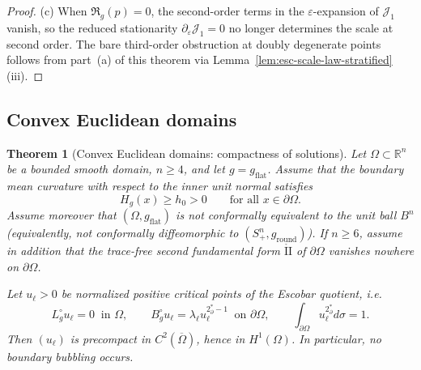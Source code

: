\documentclass[11pt,reqno,a4paper]{amsart}
\numberwithin{equation}{section}
\theoremstyle{plain}
\newtheorem{theorem}{Theorem}[section]
\theoremstyle{remark}
\theoremstyle{plain}
\begin{document}
\begin{proof}
\smallskip
(c) When $\mathfrak R_g(p)=0$, the second-order terms in the $\varepsilon$-expansion of $\mathcal J_1$ vanish,
so the reduced stationarity $\partial_\varepsilon\mathcal J_1=0$ no longer determines the scale at second order.
The bare third-order obstruction at doubly degenerate points follows from part~(a) of this theorem
via Lemma~\ref{lem:esc-scale-law-stratified}(iii).
\end{proof}

\subsection{Convex Euclidean domains}

\begin{theorem}[Convex Euclidean domains: compactness of solutions]\label{thm:convex-compactness}
Let $\Omega\subset\mathbb R^n$ be a bounded smooth domain, $n\ge4$, and let
$g=g_{\mathrm{flat}}$. Assume that the boundary mean curvature with respect to the
\emph{inner} unit normal satisfies
\[
H_g(x)\ge h_0>0 \qquad \text{for all }x\in\partial\Omega.
\]
Assume moreover that $(\Omega,g_{\mathrm{flat}})$ is not conformally equivalent to the
unit ball $B^n$ (equivalently, not conformally diffeomorphic to
$(S^n_+,g_{\mathrm{round}})$). If $n\ge6$, assume in addition that the trace-free second
fundamental form $\mathring{\mathrm{II}}$ of $\partial\Omega$ vanishes nowhere on $\partial\Omega$.

Let $u_\ell>0$ be normalized positive critical points of the Escobar quotient, i.e.
\[
L_g^\circ u_\ell=0 \ \text{ in }\Omega,\qquad
B_g^\circ u_\ell=\lambda_\ell u_\ell^{2^*_\partial-1}\ \text{ on }\partial\Omega,
\qquad
\int_{\partial\Omega}u_\ell^{2^*_\partial}d\sigma=1.
\]
Then $(u_\ell)$ is precompact in $C^2(\overline\Omega)$, hence in $H^1(\Omega)$.
In particular, no boundary bubbling occurs.
\end{theorem}
\end{document}
